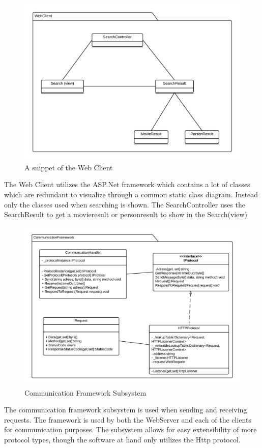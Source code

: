 \begin{figure}[H]
\includegraphics[width=\linewidth]{img/SDD/WebClientSubsystem.png}
\caption{A snippet of the Web Client}
\label{fig:WebClientSubsystem}
\end{figure}

The Web Client utilizes the ASP.Net framework which contains a lot of classes which are redundant to visualize through a common static class diagram. Instead only the classes used when searching is shown. The SearchController uses the SearchResult to get a movieresult or personresult to show in the Search(view)\\

\begin{figure}[H]
\includegraphics[width=\linewidth]{img/SDD/CommunicationFrameWork.png}
\caption{Communication Framework Subsystem}
\label{fig:CommunicationFramework}
\end{figure}
The communication framework subsystem is used when sending and receiving requests. The framework is used by both the WebServer and each of the clients for communication purposes. The subsystem allows for easy extensibility of more protocol types, though the software at hand only utilizes the Http protocol.

